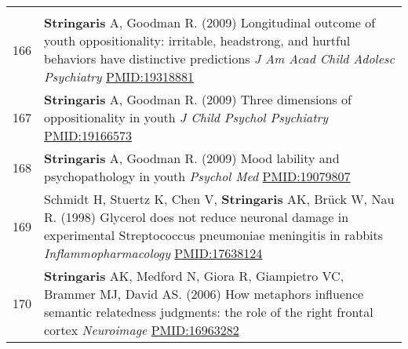 \documentclass[
]{article}
\begin{document}
\begin{longtable}[]{@{}ll@{}}
\begin{minipage}[t]{0.94\columnwidth}
\end{minipage}\tabularnewline
\begin{minipage}[t]{0.01\columnwidth}\raggedright
166\strut
\end{minipage} & \begin{minipage}[t]{0.94\columnwidth}\raggedright
\textbf{Stringaris} A, Goodman R. (2009) Longitudinal outcome of youth
oppositionality: irritable, headstrong, and hurtful behaviors have
distinctive predictions \emph{J Am Acad Child Adolesc Psychiatry}
\url{PMID:19318881}\strut
\end{minipage}\tabularnewline
\begin{minipage}[t]{0.01\columnwidth}\raggedright
167\strut
\end{minipage} & \begin{minipage}[t]{0.94\columnwidth}\raggedright
\textbf{Stringaris} A, Goodman R. (2009) Three dimensions of
oppositionality in youth \emph{J Child Psychol Psychiatry}
\url{PMID:19166573}\strut
\end{minipage}\tabularnewline
\begin{minipage}[t]{0.01\columnwidth}\raggedright
168\strut
\end{minipage} & \begin{minipage}[t]{0.94\columnwidth}\raggedright
\textbf{Stringaris} A, Goodman R. (2009) Mood lability and
psychopathology in youth \emph{Psychol Med} \url{PMID:19079807}\strut
\end{minipage}\tabularnewline
\begin{minipage}[t]{0.01\columnwidth}\raggedright
169\strut
\end{minipage} & \begin{minipage}[t]{0.94\columnwidth}\raggedright
Schmidt H, Stuertz K, Chen V, \textbf{Stringaris} AK, Brück W, Nau R.
(1998) Glycerol does not reduce neuronal damage in experimental
Streptococcus pneumoniae meningitis in rabbits
\emph{Inflammopharmacology} \url{PMID:17638124}\strut
\end{minipage}\tabularnewline
\begin{minipage}[t]{0.01\columnwidth}\raggedright
170\strut
\end{minipage} & \begin{minipage}[t]{0.94\columnwidth}\raggedright
\textbf{Stringaris} AK, Medford N, Giora R, Giampietro VC, Brammer MJ,
David AS. (2006) How metaphors influence semantic relatedness judgments:
the role of the right frontal cortex \emph{Neuroimage}
\url{PMID:16963282}\strut
\end{minipage}\tabularnewline

\end{longtable}
\end{document}
